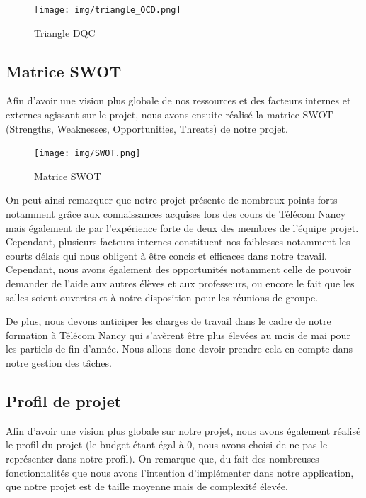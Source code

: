 \documentclass[french,a4paper]{article}
\begin{document}
    \begin{figure}[H]
        \centering
        \texttt{[image: img/triangle\_QCD.png]}
        \caption{Triangle DQC}
    \end{figure}

    \subsection{Matrice SWOT}
    Afin d’avoir une vision plus globale de nos ressources et des facteurs internes et externes agissant sur le projet, nous avons ensuite réalisé la matrice SWOT (Strengths, Weaknesses, Opportunities, Threats) de notre projet.

    \begin{figure}[H]
        \centering
        \texttt{[image: img/SWOT.png]}
        \caption{Matrice SWOT}
    \end{figure}

    On peut ainsi remarquer que notre projet présente de nombreux points forts notamment grâce aux connaissances acquises lors des cours de Télécom Nancy
    mais également de par l’expérience forte de deux des membres de l’équipe projet.  Cependant, plusieurs facteurs internes constituent nos faiblesses
    notamment les courts délais qui nous obligent à être concis et efficaces dans notre travail. Cependant, nous avons également des opportunités notamment
    celle de pouvoir demander de l'aide aux autres élèves et aux professeurs, ou encore le fait que les salles soient ouvertes et à notre disposition pour
    les réunions de groupe.

    De plus, nous devons anticiper les charges de travail dans le cadre de notre formation à Télécom Nancy qui s'avèrent être plus élevées au mois de mai
    pour les partiels de fin d'année. Nous allons donc devoir prendre cela en compte dans notre gestion des tâches.

    \subsection{Profil de projet}

    Afin d’avoir une vision plus globale sur notre projet, nous avons également réalisé le profil du projet (le budget étant égal à 0, nous avons choisi de ne pas le représenter dans notre profil). On remarque que, du fait des nombreuses fonctionnalités que nous avons l’intention d’implémenter dans notre application, que notre projet est de taille moyenne mais de complexité élevée.
\end{document}

